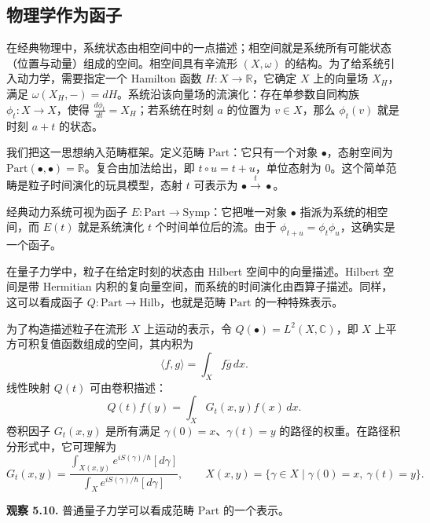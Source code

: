 
\subsection{物理学作为函子}
在经典物理中，系统状态由相空间中的一点描述；相空间就是系统所有可能状态（位置与动量）组成的空间。相空间具有辛流形 $(X,\omega)$ 的结构。为了给系统引入动力学，需要指定一个 Hamilton 函数 $H\colon X\to\mathbb R$，它确定 $X$ 上的向量场 $X_H$，满足 $\omega(X_H,-)=dH$。系统沿该向量场的流演化：存在单参数自同构族 $\phi_t\colon X\to X$，使得 $\frac{d\phi_t}{dt}=X_H$；若系统在时刻 $a$ 的位置为 $v\in X$，那么 $\phi_t(v)$ 就是时刻 $a+t$ 的状态。

我们把这一思想纳入范畴框架。定义范畴 $\mathrm{Part}$：它只有一个对象 $\bullet$，态射空间为 $\mathrm{Part}(\bullet,\bullet)=\mathbb R$。复合由加法给出，即 $t\circ u=t+u$，单位态射为 $0$。这个简单范畴是粒子时间演化的玩具模型，态射 $t$ 可表示为 $\bullet\xrightarrow{t}\bullet$。

经典动力系统可视为函子 $E\colon\mathrm{Part}\to\mathrm{Symp}$：它把唯一对象 $\bullet$ 指派为系统的相空间，而 $E(t)$ 就是系统演化 $t$ 个时间单位后的流。由于 $\phi_{t+u}=\phi_t\phi_u$，这确实是一个函子。

在量子力学中，粒子在给定时刻的状态由 Hilbert 空间中的向量描述。Hilbert 空间是带 Hermitian 内积的复向量空间，而系统的时间演化由酉算子描述。同样，这可以看成函子 $Q\colon\mathrm{Part}\to\mathrm{Hilb}$，也就是范畴 $\mathrm{Part}$ 的一种特殊表示。

\setcounter{exam}{8}\begin{example}[粒子范畴的表示]
为了构造描述粒子在流形 $X$ 上运动的表示，令 $Q(\bullet)=L^2(X,\mathbb C)$，即 $X$ 上平方可积复值函数组成的空间，其内积为
\[
  \langle f,g\rangle=\int_X f\overline g\,dx.
\]
线性映射 $Q(t)$ 可由卷积描述：
\[
  Q(t)f(y)=\int_X G_t(x,y)f(x)\,dx.
\]
卷积因子 $G_t(x,y)$ 是所有满足 $\gamma(0)=x$、$\gamma(t)=y$ 的路径的权重。在路径积分形式中，它可理解为
\[
  G_t(x,y)=
  \frac{\displaystyle\int_{X(x,y)}e^{iS(\gamma)/\hbar}[d\gamma]}
       {\displaystyle\int_Xe^{iS(\gamma)/\hbar}[d\gamma]},
  \qquad
  X(x,y)=\{\gamma\in X\mid\gamma(0)=x,\ \gamma(t)=y\}.
\]
\end{example}

\begin{note}\label{note:ordinary-quantum-representation}
\textbf{观察 5.10.} 普通量子力学可以看成范畴 $\mathrm{Part}$ 的一个表示。
\end{note}

